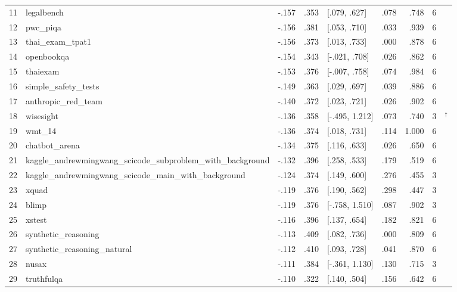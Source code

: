 \begin{longtable}{@{}r>{\raggedright\arraybackslash}p{}rrlrrr>{\raggedright\arraybackslash}p{}@{}}
11 & legalbench & -.157 & .353 & [.079, .627] & .078 & .748 & 6 & \citealp{guha2023legalbench} \\
12 & pwc\_piqa & -.156 & .381 & [.053, .710] & .033 & .939 & 6 & \citealp{bisk2019piqa} \\
13 & thai\_exam\_tpat1 & -.156 & .373 & [.013, .733] & .000 & .878 & 6 & \citealp{pipatanakul2023typhoon} \\
14 & openbookqa & -.154 & .343 & [-.021, .708] & .026 & .862 & 6 & \citealp{mihaylov2018can} \\
15 & thaiexam & -.153 & .376 & [-.007, .758] & .074 & .984 & 6 & \citealp{pipatanakul2023typhoon} \\
16 & simple\_safety\_tests & -.149 & .363 & [.029, .697] & .039 & .886 & 6 & \citealp{vidgen2023simplesafetytests} \\
17 & anthropic\_red\_team & -.140 & .372 & [.023, .721] & .026 & .902 & 6 & \citealp{ganguli2022red} \\
18 & wisesight & -.136 & .358 & [-.495, 1.212] & .073 & .740 & 3 & \citealp{susanto2025sea}$^\dagger$ \\
19 & wmt\_14 & -.136 & .374 & [.018, .731] & .114 & 1.000 & 6 & \citealp{bojar2014findings} \\
20 & chatbot\_arena & -.134 & .375 & [.116, .633] & .026 & .650 & 6 & \citealp{zheng2023judging} \\
21 & kaggle\_andrewmingwang\_scicode\_subproblem\_with\_background & -.132 & .396 & [.258, .533] & .179 & .519 & 6 & \citealp{tian2024scicode} \\
22 & kaggle\_andrewmingwang\_scicode\_main\_with\_background & -.124 & .374 & [.149, .600] & .276 & .455 & 3 & \citealp{tian2024scicode} \\
23 & xquad & -.119 & .376 & [.190, .562] & .298 & .447 & 3 & \citealp{artetxe2019cross} \\
24 & blimp & -.119 & .376 & [-.758, 1.510] & .087 & .902 & 3 & \citealp{warstadt2019blimp} \\
25 & xstest & -.116 & .396 & [.137, .654] & .182 & .821 & 6 & \citealp{rottger2023xstest} \\
26 & synthetic\_reasoning & -.113 & .409 & [.082, .736] & .000 & .809 & 6 & \citealp{helm2023} \\
27 & synthetic\_reasoning\_natural & -.112 & .410 & [.093, .728] & .041 & .870 & 6 & \citealp{helm2023} \\
28 & nusax & -.111 & .384 & [-.361, 1.130] & .130 & .715 & 3 & \citealp{winata2022nusax} \\
29 & truthfulqa & -.110 & .322 & [.140, .504] & .156 & .642 & 6 & \citealp{lin2021truthfulqa} \\

\end{longtable}
